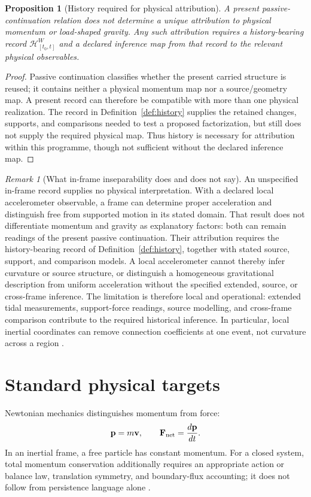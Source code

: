 \documentclass[11pt,a4paper]{article}
\newtheorem{proposition}[definition]{Proposition}
\theoremstyle{remark}
\newtheorem{remark}[definition]{Remark}
\newcommand{\Hist}{\mathcal H}
\begin{document}
\begin{proposition}[History required for physical attribution]\label{prop:history}
A present passive-continuation relation does not determine a unique attribution
to physical momentum or load-shaped gravity. Any such attribution requires a
history-bearing record $\Hist^W_{[t_0,t]}$ and a declared inference map from
that record to the relevant physical observables.
\end{proposition}
\begin{proof}
Passive continuation classifies whether the present carried structure is reused;
it contains neither a physical momentum map nor a source/geometry map. A present
record can therefore be compatible with more than one physical realization. The
record in Definition~\ref{def:history} supplies the retained changes, supports,
and comparisons needed to test a proposed factorization, but still does not
supply the required physical map. Thus history is necessary for attribution
within this programme, though not sufficient without the declared inference
map.
\end{proof}

\begin{remark}[What in-frame inseparability does and does not say]
An unspecified in-frame record supplies no physical interpretation. With a
declared local accelerometer observable, a frame can determine proper
acceleration and distinguish free from supported motion in its stated domain.
That result does not differentiate momentum and gravity as explanatory factors:
both can remain readings of the present passive continuation. Their attribution
requires the history-bearing record of Definition~\ref{def:history}, together
with stated source, support, and comparison models. A local accelerometer cannot
thereby infer curvature or source structure, or distinguish a homogeneous
gravitational description from uniform acceleration without the specified
extended, source, or cross-frame inference. The limitation is therefore local
and operational: extended tidal measurements, support-force readings, source
modelling, and cross-frame comparison contribute to the required historical
inference. In particular, local inertial coordinates can remove connection
coefficients at one event, not curvature across a region \citep{einstein1916}.
\end{remark}

\section{Standard physical targets}\label{sec:targets}
Newtonian mechanics distinguishes momentum from force:
\[
 \mathbf p=m\mathbf v,\qquad \mathbf F_{\rm net}=\frac{d\mathbf p}{dt}.
\]
In an inertial frame, a free particle has constant momentum. For a closed
system, total momentum conservation additionally requires an appropriate action
or balance law, translation symmetry, and boundary-flux accounting; it does not
follow from persistence language alone \citep{newton1687,noether1918}.
\end{document}

